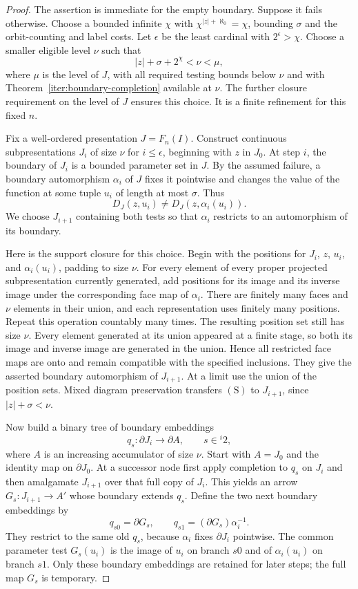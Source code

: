 \begin{proof}
The assertion is immediate for the empty boundary.
Suppose it fails otherwise. Choose a bounded infinite
$\chi$ with $\chi^{|z|+\aleph_0}=\chi$, bounding
$\sigma$ and the orbit-counting and label costs. Let
$\epsilon$ be the least cardinal with $2^\epsilon>\chi$.
Choose a smaller eligible level $\nu$ such that
\[
 |z|+\sigma+2^\chi<\nu<\mu,
\]
where $\mu$ is the level of $J$, with all required testing bounds
below $\nu$ and with
Theorem~\ref{iter:boundary-completion} available at $\nu$.
The further closure requirement on the level of $J$
ensures this choice. It is a finite refinement for this
fixed $n$.

Fix a well-ordered presentation $J=F_n(I)$. Construct
continuous subpresentations $J_i$ of size $\nu$ for
$i\le\epsilon$, beginning with $z$ in $J_0$.
At step $i$, the boundary of $J_i$ is a bounded parameter
set in $J$. By the assumed failure, a boundary
automorphism $\alpha_i$ of $J$ fixes it pointwise and
changes the value of the function at some tuple $u_i$
of length at most $\sigma$. Thus
\[
 D_J(z,u_i)\ne D_J(z,\alpha_i(u_i)).
 \tag{S}
\]
We choose $J_{i+1}$ containing both tests so that
$\alpha_i$ restricts to an automorphism of its boundary.

Here is the support closure for this choice. Begin with
the positions for $J_i$, $z$, $u_i$, and
$\alpha_i(u_i)$, padding to size $\nu$. For every element
of every proper projected subpresentation currently
generated, add positions for its image and its inverse
image under the corresponding face map of $\alpha_i$.
There are finitely many faces and $\nu$ elements in their
union, and each representation uses finitely many
positions. Repeat this operation countably many times.
The resulting position set still has size $\nu$.
Every element generated at its union appeared at a
finite stage, so both its image and inverse image are
generated in the union. Hence all restricted face maps
are onto and remain compatible with the specified
inclusions. They give the asserted boundary
automorphism of $J_{i+1}$. At a limit use the union of
the position sets. Mixed diagram preservation transfers
$(\mathrm S)$ to $J_{i+1}$, since $|z|+\sigma<\nu$.

Now build a binary tree of boundary embeddings
\[
 q_s:\partial J_i\longrightarrow\partial A,
 \qquad s\in{}^i2,
\]
where $A$ is an increasing accumulator of size $\nu$.
Start with $A=J_0$ and the identity map on $\partial J_0$.
At a successor node first apply completion to $q_s$
on $J_i$ and then amalgamate $J_{i+1}$ over that full
copy of $J_i$. This yields an arrow
$G_s:J_{i+1}\to A'$ whose boundary extends $q_s$.
Define the two next boundary embeddings by
\[
 q_{s0}=\partial G_s,
 \qquad
 q_{s1}=(\partial G_s)\alpha_i^{-1}.
\]
They restrict to the same old $q_s$, because
$\alpha_i$ fixes $\partial J_i$ pointwise. The common
parameter test $G_s(u_i)$ is the image of $u_i$ on
branch $s0$ and of $\alpha_i(u_i)$ on branch $s1$.
Only these boundary embeddings are retained for later
steps; the full map $G_s$ is temporary.


\end{proof}
